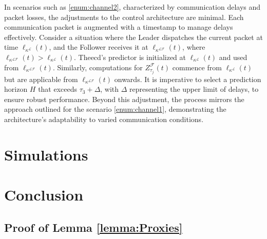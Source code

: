 In scenarios such as \ref{enum:channel2}, characterized by communication delays and packet losses, the adjustments to the control architecture are minimal. Each communication packet is augmented with a timestamp to manage delays effectively. Consider a situation where the Leader dispatches the current packet at time $\ell_{\kappa^\mathcal{L}}(t)$, and the Follower receives it at $\ell_{\kappa^\mathcal{LF}}(t)$, where $\ell_{\kappa^\mathcal{LF}}(t) > \ell_{\kappa^\mathcal{L}}(t)$. The\gls{ecd}'s predictor is initialized at $\ell_{\kappa^\mathcal{L}}(t)$ and used from $\ell_{\kappa^\mathcal{LF}}(t)$. Similarly, computations for $Z_{\tau_j}^{\mathcal{F}}(t)$ commence from $\ell_{\kappa^\mathcal{L}}(t)$ but are applicable from $\ell_{\kappa^\mathcal{LF}}(t)$ onwards. It is imperative to select a prediction horizon $H$ that exceeds $\tau_3 + \Delta$, with $\Delta$ representing the upper limit of delays, to ensure robust performance. Beyond this adjustment, the process mirrors the approach outlined for the scenario \ref{enum:channel1}, demonstrating the architecture's adaptability to varied communication conditions.










%
\section{Simulations}
\label{sec:Simulations}




\section{Conclusion}
\label{sec:conclusion}



\appendix

\subsection{Proof of Lemma \ref{lemma:Proxies}}
\label{appendix:proxy}



